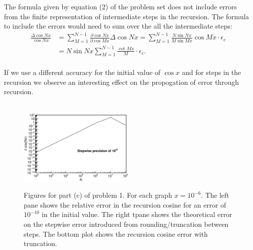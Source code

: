 \documentclass[singlepage,notitlepage,nofootinbib,12pt]{revtex4-1}
\begin{document}
\indent The formula given by equation (2) of the problem set does not include errors from the finite representation of intermediate steps in the recursion. The formula to include the errors would need to sum over the all the intermediate steps:
\begin{align*}
\frac{\Delta\cos Nx}{\cos Nx} &= \sum_{M=1}^{N-1}\frac{\partial \cos Nx}{\partial \cos Mx}\Delta\cos Nx = \sum_{M=1}^{N-1}\frac{N\sin Nx}{M\sin Mx}\cos Mx \cdot \epsilon_c\\
&= N\sin Nx\sum_{M=1}^{N-1}\frac{\cot Mx}{M} \cdot \epsilon_c.
\end{align*}
\\
\indent If we use a different accuracy for the initial value of $\cos x$ and for steps in the recursion we observe an interesting effect on the propogation of error through recursion.
\begin{figure}[h]
  \centering
{}
\\
  \includegraphics[width=0.5\textwidth]{figures/1c_stepwise.eps}
  \hfill
  \caption{Figures for part (c) of problem 1. For each graph $x = 10^{-6}$. The left pane shows the relative error in the recursion cosine for an error of $10^{-10}$ in the initial value. The right tpane shows the theoretical error on the stepwise error introduced from rounding/truncation between steps. The bottom plot shows the recursion cosine error with truncation.}
\end{figure}
\end{document}
